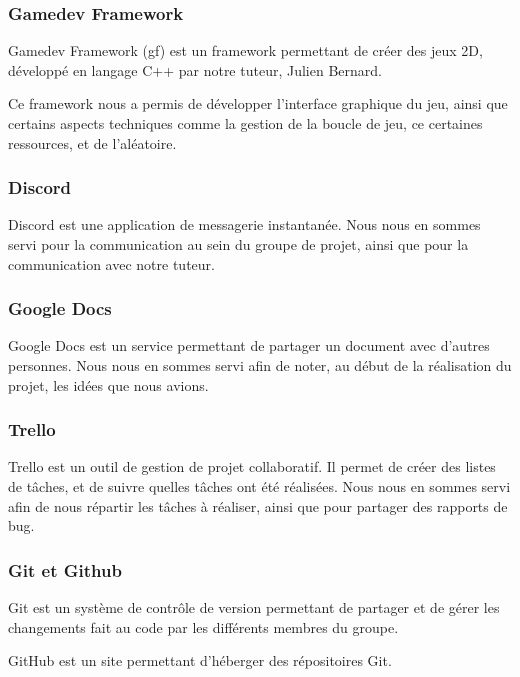 \documentclass[10pt]{report}
\begin{document}
\subsubsection{Gamedev Framework}

Gamedev Framework (gf) est un framework permettant de créer des jeux 2D, développé en langage C++ par notre
tuteur, Julien Bernard.

Ce framework nous a permis de développer l'interface graphique du jeu, ainsi que certains aspects techniques comme
la gestion de la boucle de jeu, ce certaines ressources, et de l'aléatoire.

\subsubsection{Discord}

Discord est une application de messagerie instantanée.
Nous nous en sommes servi pour la communication au sein du groupe de projet, ainsi que pour la communication avec
notre tuteur.

\subsubsection{Google Docs} %

Google Docs est un service permettant de partager un document avec d'autres personnes.
Nous nous en sommes servi afin de noter, au début de la réalisation du projet, les idées que nous avions.

\subsubsection{Trello}

Trello est un outil de gestion de projet collaboratif.
Il permet de créer des listes de tâches, et de suivre quelles tâches ont été réalisées.
Nous nous en sommes servi afin de nous répartir les tâches à réaliser, ainsi que pour partager des rapports de bug.

\subsubsection{Git et Github}

Git est un système de contrôle de version permettant de partager et de gérer les changements fait au code par
les différents membres du groupe.

GitHub est un site permettant d'héberger des répositoires Git.
\end{document}
